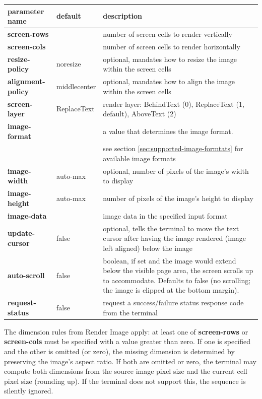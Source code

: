 \documentclass[a4paper]{article}
\begin{document}
\begin{tabular}{|m{3cm}|m{2cm}|m{11cm}|}
    \hline
    \textbf{parameter name} & \textbf{default} & \textbf{description} \\
    \hline
    \textbf{screen-rows}      &                  & number of screen cells to render vertically \\
    \textbf{screen-cols}      &                  & number of screen cells to render horizontally \\
    \textbf{resize-policy}    & noresize         & optional, mandates how to resize the image within the screen cells \\
    \textbf{alignment-policy} & middlecenter     & optional, mandates how to align the image within the screen cells \\
    \textbf{screen-layer}     & ReplaceText      & render layer: BehindText (0), ReplaceText (1, default), AboveText (2) \\
    \textbf{image-format}     &                  & a value that determines the image format. \\
                              &                  & see section \ref{sec:supported-image-formtats} for available image formats \\
    \textbf{image-width}      & auto-max         & optional, number of pixels of the image's width to display \\
    \textbf{image-height}     & auto-max         & number of pixels of the image's height to display \\
    \textbf{image-data}       &                  & image data in the specified input format \\
    \textbf{update-cursor}    & false            & optional, tells the terminal to move the text cursor after having the image rendered (image left aligned) below the image \\
    \textbf{auto-scroll}      & false            & boolean, if set and the image would extend below the visible page area,
                                                    the screen scrolls up to accommodate.
                                                    Defaults to false (no scrolling; the image is clipped at the bottom margin). \\
    \textbf{request-status}   & false            & request a success/failure status response code from the terminal \\
    \hline
\end{tabular}

The dimension rules from Render Image apply: at least one of \textbf{screen-rows}
or \textbf{screen-cols} must be specified with a value greater than zero.
If one is specified and the other is omitted (or zero), the missing dimension
is determined by preserving the image's aspect ratio.
If both are omitted or zero, the terminal may compute both dimensions
from the source image pixel size and the current cell pixel size (rounding up).
If the terminal does not support this, the sequence is silently ignored.
\end{document}
